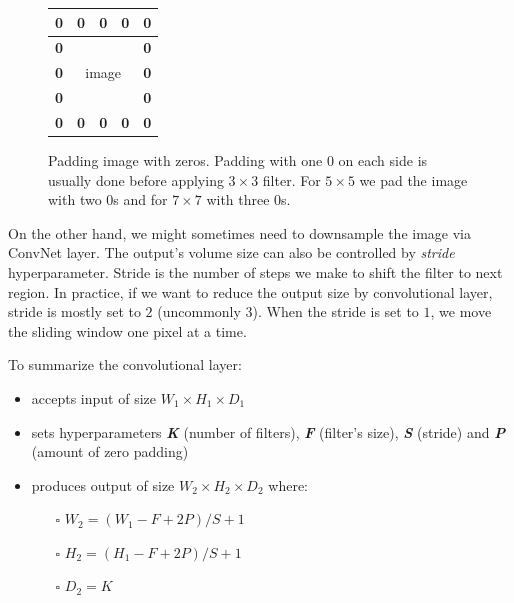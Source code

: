 \begin{figure}[!h]
    \centering
    \begin{tabular}{|r|r|r|r|r|}
        \hline
        \textbf{0} & \textbf{0} & \textbf{0} & \textbf{0} & \textbf{0} \\ \hline
        \textbf{0} & \multicolumn{3}{c|}{\multirow{3}{*}{image}} & \textbf{0} \\ \cline{1-1} \cline{5-5} 
        \textbf{0} & \multicolumn{3}{c|}{}                  & \textbf{0} \\ \cline{1-1} \cline{5-5} 
        \textbf{0} & \multicolumn{3}{c|}{}                  & \textbf{0} \\ \hline
        \textbf{0} & \textbf{0} & \textbf{0} & \textbf{0} & \textbf{0} \\ \hline
    \end{tabular}
    \caption[Padding image with zeros]{Padding image with zeros. Padding with one 0 on each side
    is usually done before applying $3\times 3$ filter. For $5\times 5$ we pad the image
    with two 0s and for $7\times 7$ with three 0s.}
    \label{img:zeropadding}
\end{figure}

On the other hand, we might sometimes need to downsample the image via ConvNet layer. The
output's volume size can also be controlled by \textit{stride} hyperparameter. Stride is
the number of steps we make to shift the filter to next region. In practice, if we want
to reduce the output size by convolutional layer, stride is mostly set to $2$
(uncommonly 3). When the stride is set to $1$, we move the sliding window one pixel at a
time.

To summarize the convolutional layer: \cite{bib:cnncs231n}
\begin{itemize}
    \item accepts input of size $W_1\times H_1 \times D_1$
    \item sets hyperparameters \textbf{\textit{K}} (number of filters),
        \textbf{\textit{F}} (filter's size), \textbf{\textit{S}} (stride) and
        \textbf{\textit{P}} (amount of zero padding)
    \item produces output of size $W_2\times H_2\times D_2$ where:
    \begin{itemize}
        \item[$\square$] $W_2 = (W_1 - F + 2P) / S + 1$
        \item[$\square$] $H_2 = (H_1 - F + 2P) / S + 1$
        \item[$\square$] $D_2 = K$
    \end{itemize}
\end{itemize}

